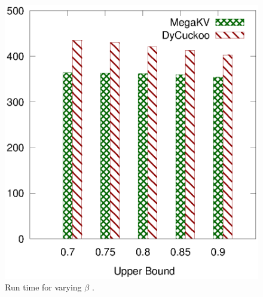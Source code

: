 \begin{figure}[htp]
\begin{minipage}{0.19\linewidth}
		\centerline{\dsali}
	\end{minipage}
	\begin{minipage}{0.19\linewidth}\centering
		\includegraphics[width=\linewidth]{pic/dynamic/upper/dynamic_random.eps}
		\centerline{\dsrandom}
	\end{minipage}
	\caption{Run time for varying $\beta$ .}
	\label{fig:vary-upper-time}
\end{figure}

